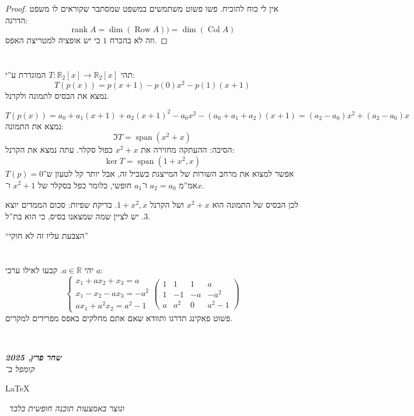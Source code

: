 \documentclass[]{article}
\newcommand\en[1] {\begin{otherlanguage}{english}#1\end{otherlanguage}}
\newcommand\ndoc  {\dotfill \\ \vfil {\begin{center}
			{\textbf{\textit{שחר פרץ, 2025}} \\
				\scriptsize \textit{קומפל ב־}\en{\LaTeX}\,\textit{ ונוצר באמצעות תוכנה חופשית בלבד}}
	\end{center}} \vfil	}
\newcommand\R     {\mathbb{R}}
\DeclareMathOperator{\Sp}     {span}
\DeclareMathOperator{\row}    {Row}
\DeclareMathOperator{\rk}     {rank}
\DeclareMathOperator{\col}    {Col}
\newcommand\co        {\colon}
\newcommand\pms[1]    {\begin{pmatrix}
		#1
\end{pmatrix}}
\newcommand\dequad    {\!\!\!\!\!\!}
\theoremstyle{definition}
\begin{document}
	\begin{proof}
		אין לי כוח להוכיח. פשו פשוט משתמשים במשפט שמסתבר שקוראים לו משפט הדרגה: 
		\[ \rk A = \dim(\row A)) = \dim(\col A) \]
		וזה לא בהכרח $1$ כי יש אופציה למטריצת האפס. 
	\end{proof}
	
	\section{}
	תהי $T\co \R_2[x] \to \R_2[x]$ המוגדרת ע''י: 
	\[ T(p(x)) = p(x + 1) - p(0)x^{2} - p(1)(x + 1) \]
	נמצא את הבסיס לתמונה ולקרנל. 
	
	\[ T(p(x)) = a_0 + a_1(x + 1) + a_2(x + 1)^{2} - a_0x^2 - (a_0 + a_1 + a_2)(x + 1) = (a_2 - a_0)x^{2} + (a_2 - a_0)x \]
	נמצא את התמונה: 
	\[ \Im T = \Sp(x^2 + x) \]
	הסיבה: ההעתקה מחזירה את $x^2 + x$ כפול סקלר. עתה נמצא את הקרנל: 
	\[ \ker T = \Sp(1 + x^2, x) \]
	אפשר למצוא את מרחב השורות של המייצגת בשביל זה, אבל יותר קל לטעון ש־$T(p) = 0$ אמ''מ $a_2 = a_0$ ו־$a_1$ חופשי, כלומר כפל בסקלר של $x^{2} + 1$ ו־$x$. 
	
	לכן הבסיס של התמונה הוא $x^2 + x$ ושל הקרנל $1 + x^2, x$. בדיקת שפיות: סכום הממדים יוצא $3$. יש לציין שמה שמצאנו בסיס, כי הוא בת''ל. 
	
	``הצבעת עליו זה לא חוקי''
	
	\section{}
	יהי $a \in \R$. קבעו לאילו ערכי $a$: 
	\[ \begin{cases}
		x_1 + ax_2 + x_3 = a \\
		x_1 - x_2 - ax_3 = -a^2 \\
		ax_1 + a^2x_2 = a^2 - 1
	\end{cases} \dequad \pms{1 & 1 & 1 & a \\ 1 & -1 & -a & -a^2 \\ a & a^2 & 0 & a^2 - 1} \]
	פשוט פאקינג תדרגו ותוודא שאם אתם מחלקים באפס מפרידים למקרים. 
	
	
	
	
	
	\ndoc
\end{document}
